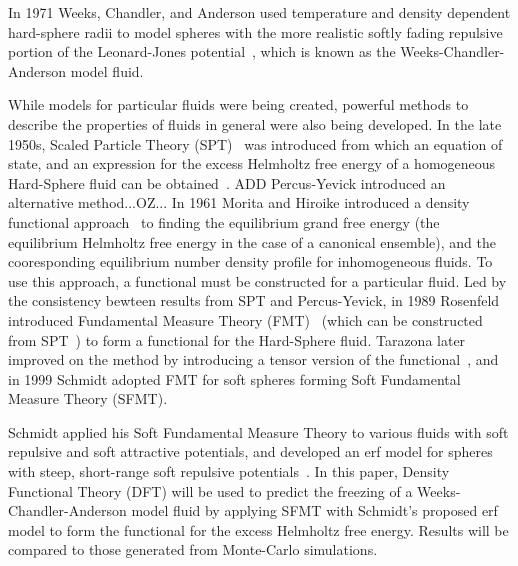 \documentclass[double,12pt]{beavtex}
\begin{document}
%
In 1971 Weeks, Chandler, and Anderson used temperature and density dependent hard-sphere 
radii to model spheres with the more realistic softly fading repulsive portion of the 
Leonard-Jones potential~\cite{andersen1971relationship}, which is known as the 
Weeks-Chandler-Anderson model fluid. 

While models for particular fluids were being created, powerful methods to describe the properties 
of fluids in general were also being developed. In the late 1950s, Scaled Particle 
Theory (SPT)~\cite{ReissSPT} was introduced from which an equation of state, and
an expression for the excess Helmholtz free energy of a homogeneous Hard-Sphere fluid can be 
obtained~\cite{Hansen}. \color{red}ADD Percus-Yevick introduced an alternative method...OZ... \color{black}
In 1961 Morita and Hiroike introduced a density functional approach~\cite{MoritaDFT} to finding the equilibrium grand free energy 
(the equilibrium Helmholtz free energy in the case of a canonical ensemble), and the cooresponding equilibrium 
number density profile for inhomogeneous fluids. To use this approach, a functional must be 
constructed for a particular fluid.
Led by the consistency bewteen results from SPT and Percus-Yevick, in 1989 Rosenfeld introduced Fundamental Measure Theory (FMT)~\cite{rosenfeld1989} 
(which can be constructed from SPT~\cite{santos2012phi3}) to form a functional for 
the Hard-Sphere fluid. 
Tarazona later improved on the method by introducing a tensor version of the 
functional~\cite{tarazonaphi3, santos2012phi3}, and in 1999 Schmidt adopted FMT for soft spheres 
forming Soft Fundamental Measure Theory (SFMT)\cite{schmidt1999density}. 

Schmidt applied his Soft Fundamental Measure Theory to various fluids with soft repulsive 
and soft attractive potentials, and developed an erf model for 
spheres with steep, short-range soft repulsive potentials~\cite{schmidt2000fluid}. In this paper, 
Density Functional Theory (DFT) will be used to predict the freezing of a 
Weeks-Chandler-Anderson model fluid by applying SFMT with Schmidt's proposed 
erf model to form the functional for the excess Helmholtz free energy. 
Results will be compared to those generated from Monte-Carlo simulations.
\end{document}
